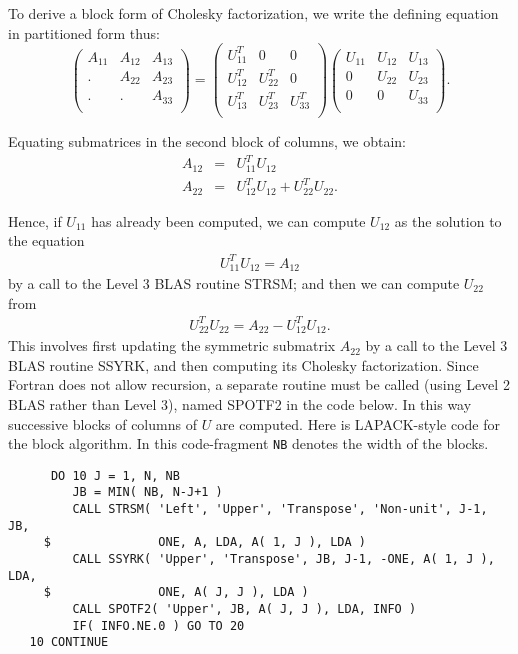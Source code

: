 To derive a block form of Cholesky
factorization, we write the
defining equation in partitioned form thus:
$$
\left( \begin{array}{ccc}
A_{11} & A_{12} & A_{13}\\
.      & A_{22} & A_{23}\\
.      & .      & A_{33}\\
\end{array} \right) =
\left( \begin{array}{ccc}
U_{11}^T & 0 & 0\\
U_{12}^T & U_{22}^T & 0\\
U_{13}^T & U_{23}^T & U_{33}^T\\
\end{array} \right)
\left( \begin{array}{ccc}
U_{11} & U_{12} & U_{13}\\
0 & U_{22} & U_{23}\\
0 & 0 & U_{33}\\
\end{array} \right).
$$

Equating submatrices in the second block of columns, we obtain:
\begin{eqnarray*}
A_{12} & = & U_{11}^T U_{12} \\
A_{22} & = & U_{12}^T U_{12} + U_{22}^T U_{22}.
\end{eqnarray*}

Hence, if $U_{11}$ has already been computed, we can compute $U_{12}$ as
the solution to the equation
\begin{eqnarray*}
U_{11}^T U_{12} = A_{12}
\end{eqnarray*}
by a call to the Level 3 BLAS routine STRSM; and then we can compute
$U_{22}$
from
\begin{eqnarray*}
U_{22}^T U_{22} = A_{22} - U_{12}^T U_{12}.
\end{eqnarray*}
This involves first updating the symmetric submatrix $A_{22}$ by a call to
the
Level 3 BLAS routine SSYRK, and then computing its Cholesky factorization.
Since Fortran does not allow recursion, a separate routine must be called
(using Level 2 BLAS rather than Level 3), named SPOTF2 in the code below.
In this way successive blocks of columns of $U$ are computed.
Here is LAPACK-style code for the block algorithm. In this code-fragment
{\tt NB} denotes the width of the blocks.

\begin{verbatim}
      DO 10 J = 1, N, NB
         JB = MIN( NB, N-J+1 )
         CALL STRSM( 'Left', 'Upper', 'Transpose', 'Non-unit', J-1, JB,
     $               ONE, A, LDA, A( 1, J ), LDA )
         CALL SSYRK( 'Upper', 'Transpose', JB, J-1, -ONE, A( 1, J ), LDA,
     $               ONE, A( J, J ), LDA )
         CALL SPOTF2( 'Upper', JB, A( J, J ), LDA, INFO )
         IF( INFO.NE.0 ) GO TO 20
   10 CONTINUE
\end{verbatim}

